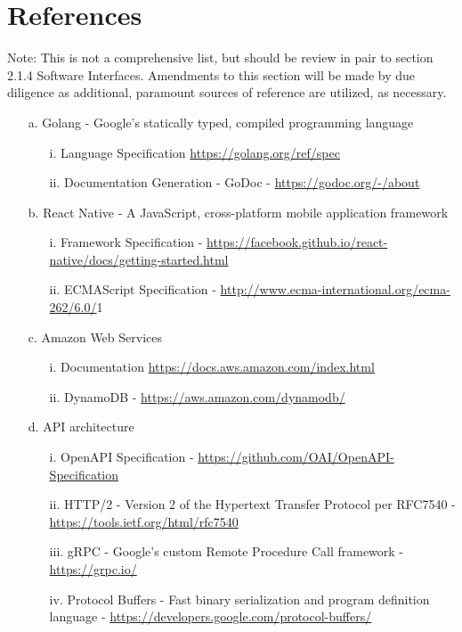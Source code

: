 \documentclass{scrreprt}
\begin{document}
\section{References}
Note: This is not a comprehensive list, but should be review in pair to section 2.1.4 Software Interfaces. Amendments to this section will be made by due diligence as additional, paramount sources of reference are utilized, as necessary.
\begin{enumerate}
\item[a.] Golang - Google's statically typed, compiled programming language
	\begin{itemize}
		\item[i.] Language Specification \url{https://golang.org/ref/spec}
		\item[ii.] Documentation Generation - GoDoc - \url{https://godoc.org/-/about}
	\end{itemize}
\item[b.] React Native - A JavaScript, cross-platform mobile application framework 
	\begin{itemize}
		\item[i.] Framework Specification - \url{https://facebook.github.io/react-native/docs/getting-started.html}
		\item[ii.] ECMAScript Specification - \url{http://www.ecma-international.org/ecma-262/6.0/}1
	\end{itemize}
\item[c.] Amazon Web Services
	\begin{itemize}
		\item[i.] Documentation \url{https://docs.aws.amazon.com/index.html}
		\item[ii.] DynamoDB - \url{https://aws.amazon.com/dynamodb/}
	\end{itemize}
\item[d.] API architecture
	\begin{itemize}
		\item[i.] OpenAPI Specification - \url{https://github.com/OAI/OpenAPI-Specification}
		\item[ii.] HTTP/2 - Version 2 of the Hypertext Transfer Protocol per RFC7540 - \url{https://tools.ietf.org/html/rfc7540}
		\item[iii.] gRPC - Google's custom Remote Procedure Call framework - \url{https://grpc.io/}
		\item[iv.] Protocol Buffers - Fast binary serialization and program definition language - \url{https://developers.google.com/protocol-buffers/}
	\end{itemize}
\end{enumerate}
\end{document}
